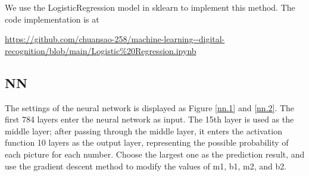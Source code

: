 \documentclass{article}
\begin{document}
	We use the LogisticRegression model in sklearn to implement this method. The code implementation is at
	
	\begin{center}
		\url{https://github.com/chuansao-258/machine-learning--digital-recognition/blob/main/Logistic\%20Regression.ipynb}
	\end{center}
 	 
 	 \subsection{NN}
 	 
	The settings of the neural network is displayed as Figure \ref{nn.1} and \ref{nn.2}. The first 784 layers enter the neural network as input. The 15th layer is used as the middle layer; after passing through the middle layer, it enters the activation function 10 layers as the output layer, representing the possible probability of each picture for each number. Choose the largest one as the prediction result, and use the gradient descent method to modify the values of m1, b1, m2, and b2.
	 
\end{document}

